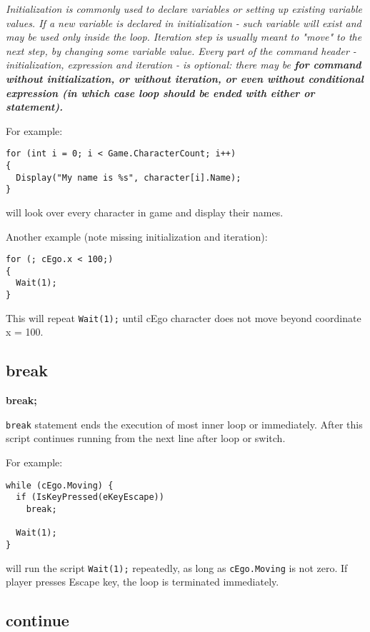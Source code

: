 \it{Initialization} is commonly used to declare variables or setting up existing variable values. If a new variable is declared
in \it{initialization} - such variable will exist and may be used only inside the loop.
\it{Iteration} step is usually meant to "move" to the next step, by changing some variable value.
Every part of the command header - \it{initialization}, \it{expression} and \it{iteration} - is optional: there may be \bf{for}
command without initialization, or without iteration, or even without conditional expression (in which case loop should be ended
with either  or  statement).

For example:

\begin{verbatim}
for (int i = 0; i < Game.CharacterCount; i++)
{
  Display("My name is %s", character[i].Name);
}
\end{verbatim}

will look over every character in game and display their names.


Another example (note missing initialization and iteration):

\begin{verbatim}
for (; cEgo.x < 100;)
{
  Wait(1);
}
\end{verbatim}

This will repeat \verb$Wait(1);$ until cEgo character does not move beyond coordinate x = 100.


\subsection{break}\label{breakstatement}%

\bf{break};

\verb$break$ statement ends the execution of most inner loop or 
immediately. After this script continues running from the next line after loop or switch.

For example:

\begin{verbatim}
while (cEgo.Moving) {
  if (IsKeyPressed(eKeyEscape))
    break;

  Wait(1);
}
\end{verbatim}

will run the script \verb$Wait(1);$ repeatedly, as long as \verb$cEgo.Moving$ is
not zero. If player presses Escape key, the loop is terminated immediately.


\subsection{continue}\label{continuestatement}%

